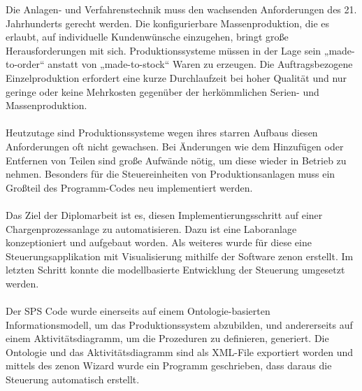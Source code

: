 Die Anlagen- und Verfahrenstechnik muss den wachsenden Anforderungen des 21. Jahrhunderts gerecht werden. Die konfigurierbare Massenproduktion, die es erlaubt, auf individuelle Kundenwünsche einzugehen, bringt große Herausforderungen mit sich. Produktionssysteme müssen in der Lage sein „made-to-order“ anstatt von „made-to-stock“ Waren zu erzeugen. Die Auftragsbezogene Einzelproduktion erfordert eine kurze Durchlaufzeit bei hoher Qualität und nur geringe oder keine Mehrkosten gegenüber der herkömmlichen Serien- und Massenproduktion. \\\\
Heutzutage sind Produktionssysteme wegen ihres starren Aufbaus diesen Anforderungen oft nicht gewachsen. Bei Änderungen wie dem Hinzufügen oder Entfernen von Teilen sind große Aufwände nötig, um diese wieder in Betrieb zu nehmen. Besonders für die Steuereinheiten von Produktionsanlagen muss ein Großteil des Programm-Codes neu implementiert werden.\\\\
Das Ziel der Diplomarbeit ist es, diesen Implementierungsschritt auf einer Chargenprozessanlage zu automatisieren. Dazu ist eine Laboranlage konzeptioniert und aufgebaut worden. Als weiteres wurde für diese eine Steuerungsapplikation mit Visualisierung mithilfe der Software zenon erstellt. Im letzten Schritt konnte die modellbasierte Entwicklung der Steuerung umgesetzt werden. 
\\\\
Der SPS Code wurde einerseits auf einem Ontologie-basierten Informationsmodell, um das Produktionssystem abzubilden, und andererseits auf einem Aktivitätsdiagramm, um die Prozeduren zu definieren, generiert. Die Ontologie und das Aktivitätsdiagramm sind als XML-File exportiert worden und mittels des zenon Wizard wurde ein Programm geschrieben, dass daraus die Steuerung automatisch erstellt.\\\\

